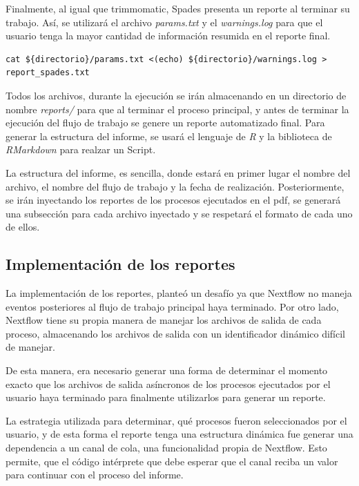 \documentclass[12pt]{article}
\begin{document}
Finalmente, al igual que trimmomatic, Spades presenta un reporte al terminar su trabajo. Así, 
se utilizará el archivo \emph{params.txt} y el \emph{warnings.log} para que el usuario tenga la mayor cantidad de 
información resumida en el reporte final.

\begin{center}
    \begin{lstlisting}[caption={Comando para el reporte de la ejecución de Spades \emph{(elaboración propia)}.}, label=lst:statsSpades]
        cat ${directorio}/params.txt <(echo) ${directorio}/warnings.log > report_spades.txt
    \end{lstlisting}
\end{center}

Todos los archivos, durante la ejecución se irán almacenando en un directorio de nombre \emph{reports/} para que al terminar el proceso principal,
y antes de terminar la ejecución del flujo de trabajo se genere un reporte automatizado final. Para generar la estructura del informe, se usará 
el lenguaje de \emph{R} y la biblioteca de \emph{RMarkdown} para realzar un Script.

La estructura del informe, es sencilla, donde estará en primer lugar el nombre del archivo, el nombre del flujo de trabajo y la fecha de realización.
Posteriormente, se irán inyectando los reportes de los procesos ejecutados en el pdf, se generará una subsección para cada archivo inyectado y se respetará
el formato de cada uno de ellos.

\subsection{Implementación de los reportes}

La implementación de los reportes, planteó un desafío ya que Nextflow 
no maneja eventos posteriores al  flujo de trabajo principal haya terminado. 
Por otro lado, Nextflow tiene su propia manera de manejar los archivos de 
salida de cada proceso, almacenando los archivos de salida con un 
identificador dinámico difícil de manejar.

De esta manera, era necesario generar una forma de determinar el 
momento exacto que los archivos de salida asíncronos de los procesos 
ejecutados por el usuario haya terminado para finalmente utilizarlos para 
generar un reporte.

La estrategia utilizada para determinar, qué procesos fueron 
seleccionados por el usuario, y de esta forma el reporte tenga 
una estructura dinámica fue generar una dependencia a un canal de 
cola, una funcionalidad propia de Nextflow. Esto permite, que el 
código intérprete que debe esperar que el canal reciba un valor para 
continuar con el proceso del informe.
\end{document}

